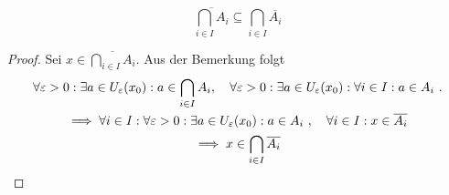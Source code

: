 \documentclass[a4paper, 12pt]{scrartcl}
\begin{document}
\begin{theorem}
    \[ \overline{\bigcap_{i\in I} A_i} \subseteq \bigcap_{i\in I} \overline{A_i} \]
\end{theorem}
\begin{proof}
Sei $x \in \overline{\bigcap_{i\in I} A_i}$. Aus der Bemerkung folgt
\begin{gather*}
    \forall \varepsilon > 0 : \exists a \in U_\varepsilon(x_0) : a \in \bigcap_{i\in I} {A_i}\qc \forall \varepsilon > 0 : \exists a \in U_\varepsilon(x_0) : \forall i \in I : a \in A_i~. \\
    \implies \forall i \in I : \forall \varepsilon > 0 : \exists a \in U_\varepsilon(x_0) : a \in A_i~\qc \forall i \in I: x \in \overline{A_i} \\
    \implies x \in \bigcap_{i\in I} \overline{A_i}
\end{gather*}
\end{proof}
\end{document}
